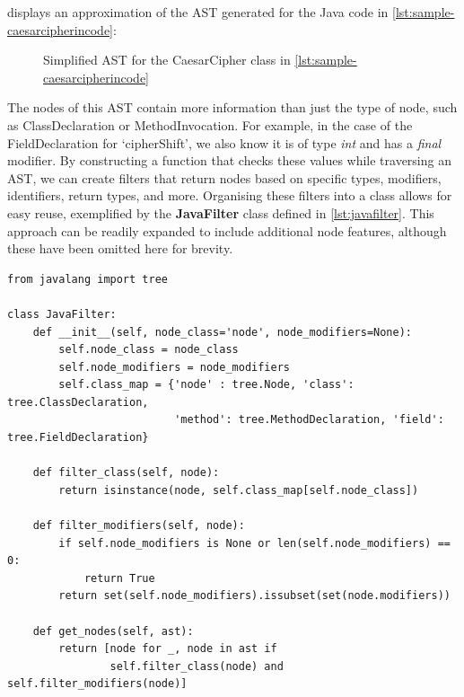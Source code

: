  displays an approximation of the AST generated for the Java code in \cref{lst:sample-caesarcipherincode}:

\begin{figure}[H]
    \centering
    
    \caption{Simplified AST for the CaesarCipher class in \cref{lst:sample-caesarcipherincode}}
    \label{fig:CaesarCipherAST}
\end{figure}

The nodes of this AST contain more information than just the type of node, such as ClassDeclaration or MethodInvocation. For example, in the case of the FieldDeclaration for `cipherShift', we also know it is of type \emph{int} and has a \emph{final} modifier. By constructing a function that checks these values while traversing an AST, we can create filters that return nodes based on specific types, modifiers, identifiers, return types, and more. Organising these filters into a class allows for easy reuse, exemplified by the \textbf{JavaFilter} class defined in \cref{lst:javafilter}. This approach can be readily expanded to include additional node features, although these have been omitted here for brevity.

\begin{listing}[H]
\begin{verbatim}
from javalang import tree

class JavaFilter:
    def __init__(self, node_class='node', node_modifiers=None):
        self.node_class = node_class
        self.node_modifiers = node_modifiers
        self.class_map = {'node' : tree.Node, 'class': tree.ClassDeclaration,
                          'method': tree.MethodDeclaration, 'field': tree.FieldDeclaration}

    def filter_class(self, node):
        return isinstance(node, self.class_map[self.node_class])

    def filter_modifiers(self, node):
        if self.node_modifiers is None or len(self.node_modifiers) == 0:
            return True
        return set(self.node_modifiers).issubset(set(node.modifiers))

    def get_nodes(self, ast):
        return [node for _, node in ast if 
                self.filter_class(node) and self.filter_modifiers(node)]
\end{verbatim}
\caption{Partial implementation of a JavaFilter Python class}
\label{lst:javafilter}
\end{listing}

